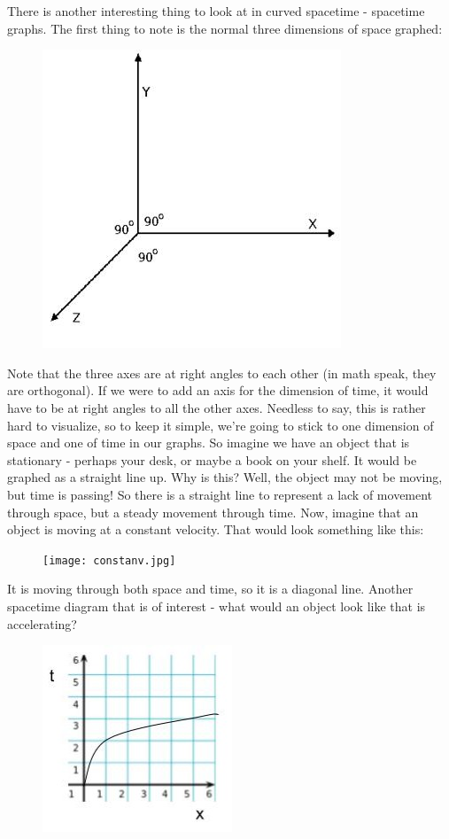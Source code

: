 There is another interesting thing to look at in curved spacetime - spacetime graphs. The first thing to note is the normal three
dimensions of space graphed:
\begin{figure}[H]
\includegraphics[scale=0.5]{3d.jpg}
\end{figure}
Note that the three axes are at right angles to each other (in math speak, they are orthogonal). If we were to add an axis for the
dimension of time, it would have to be at right angles to all the other axes. Needless to say, this is rather hard to visualize,
so to keep it simple, we're going to stick to one dimension of space and one of time in our graphs. So imagine we have an object 
that is stationary - perhaps your desk, or maybe a book on your shelf. It would be graphed as a straight line up. Why is this? 
Well, the object may not be moving, but time is passing! So there is a straight
line to represent a lack of movement through space, but a steady movement through time. Now, imagine that an object is moving at
a constant velocity. That would look something like this:
\begin{figure}[H]
\texttt{[image: constanv.jpg]}
\end{figure}
It is moving through both space and time, so it is a diagonal line. Another spacetime diagram that is of interest - what would an object
look like that is accelerating?
\begin{figure}[H]
\includegraphics[scale=0.5]{acceler.jpg}
\end{figure}
